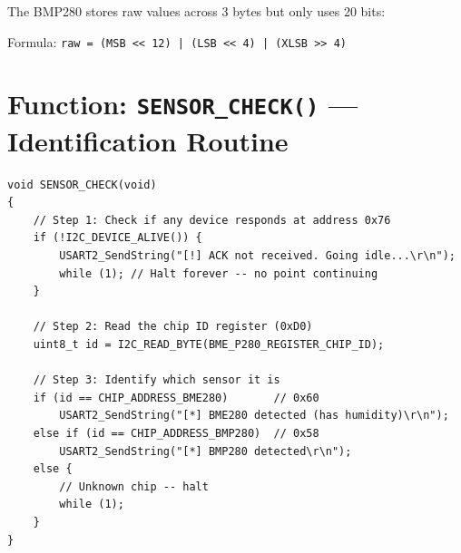 \documentclass[12pt, a4paper]{article}
\begin{document}
\begin{conceptbox}
The BMP280 stores raw values across 3 bytes but only uses 20 bits:

\begin{center}
\end{center}

Formula: \texttt{raw = (MSB << 12) | (LSB << 4) | (XLSB >> 4)}
\end{conceptbox}

\section{Function: \texttt{SENSOR\_CHECK()} --- Identification Routine}

\begin{codebox}
\begin{lstlisting}[style=CStyle]
void SENSOR_CHECK(void)
{
    // Step 1: Check if any device responds at address 0x76
    if (!I2C_DEVICE_ALIVE()) {
        USART2_SendString("[!] ACK not received. Going idle...\r\n");
        while (1); // Halt forever -- no point continuing
    }

    // Step 2: Read the chip ID register (0xD0)
    uint8_t id = I2C_READ_BYTE(BME_P280_REGISTER_CHIP_ID);

    // Step 3: Identify which sensor it is
    if (id == CHIP_ADDRESS_BME280)       // 0x60
        USART2_SendString("[*] BME280 detected (has humidity)\r\n");
    else if (id == CHIP_ADDRESS_BMP280)  // 0x58
        USART2_SendString("[*] BMP280 detected\r\n");
    else {
        // Unknown chip -- halt
        while (1);
    }
}
\end{lstlisting}
\end{codebox}
\end{document}
